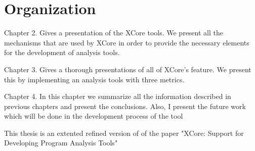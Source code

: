 \section{Organization}

        Chapter 2.  Gives a presentation of the XCore tools. We present all the mechanisms that are used by XCore in order to provide the necessary elements for the development of analysis
tools.

        Chapter 3. Gives a thorough presentations of all of XCore's feature. We present this by implementing an analysis tools with three metrics. 

        Chapter 4. In this chapter we summarize all the information
described in previous chapters and present the conclusions. Also, I present the future work which will be done in the development
process of the tool

	 This thesis is an extented refined version of of the paper "XCore: Support for Developing Program Analysis Tools" \cite{paper:xcore}


